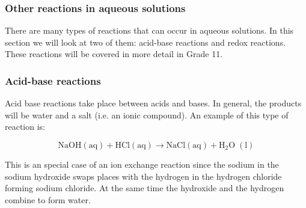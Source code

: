             \subsubsection{ Other reactions in aqueous solutions}
            \nopagebreak
\label{m38719*id08212}
There are many types of reactions that can occur in aqueous solutions. In this section we will look at two of them: acid-base reactions and redox reactions. These reactions will be covered in more detail in Grade 11. 
\par 
\label{m38719*eip-329}
            \subsubsection{ Acid-base reactions}
            \nopagebreak
\label{m38719*id0821354}Acid base reactions take place between acids and bases. In general, the products will be water and a salt (i.e. an ionic compound). An example of this type of reaction is: \label{m38719*eid1534}\nopagebreak\noindent{}
	    
    \begin{equation}
    \mathrm{NaOH\left(aq\right)}+\mathrm{HCl\left(aq\right)}\to \mathrm{NaCl\left(aq\right)}+{\mathrm{H}}_{2}\mathrm{O\; \left(l\right)}\tag{17.26}
      \end{equation}
\par \label{m38719*eip-588}This is an special case of an ion exchange reaction since the sodium in the sodium hydroxide swaps places with the hydrogen in the hydrogen chloride forming sodium chloride. At the same time the hydroxide and the hydrogen combine to form water. \par 
\label{m38719*eip-454}
